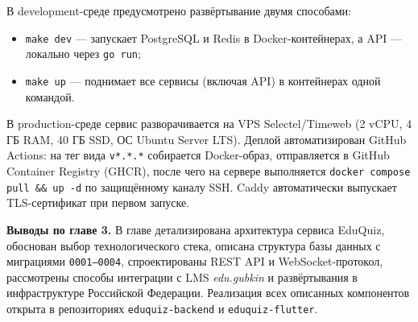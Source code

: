 В development-среде предусмотрено развёртывание двумя способами:
\begin{itemize}[noitemsep]
    \item \texttt{make dev} --- запускает PostgreSQL и Redis
          в Docker-контейнерах, а API --- локально через
          \texttt{go run};
    \item \texttt{make up} --- поднимает все сервисы (включая API)
          в контейнерах одной командой.
\end{itemize}

В production-среде сервис разворачивается на VPS Selectel/Timeweb
(2 vCPU, 4 ГБ RAM, 40 ГБ SSD, ОС Ubuntu Server LTS). Деплой
автоматизирован GitHub Actions: на тег вида \texttt{v*.*.*}
собирается Docker-образ, отправляется в GitHub Container Registry
(GHCR), после чего на сервере выполняется \texttt{docker compose pull \&\& up -d}
по защищённому каналу SSH. Caddy автоматически выпускает
TLS-сертификат при первом запуске.

\textbf{Выводы по главе 3.}
В главе детализирована архитектура сервиса EduQuiz, обоснован
выбор технологического стека, описана структура базы данных
с миграциями \texttt{0001--0004}, спроектированы REST API
и WebSocket-протокол, рассмотрены способы интеграции с LMS
\textit{edu.gubkin} и развёртывания в инфраструктуре Российской
Федерации. Реализация всех описанных компонентов открыта в
репозиториях \texttt{eduquiz-backend} и \texttt{eduquiz-flutter}.

\newpage
